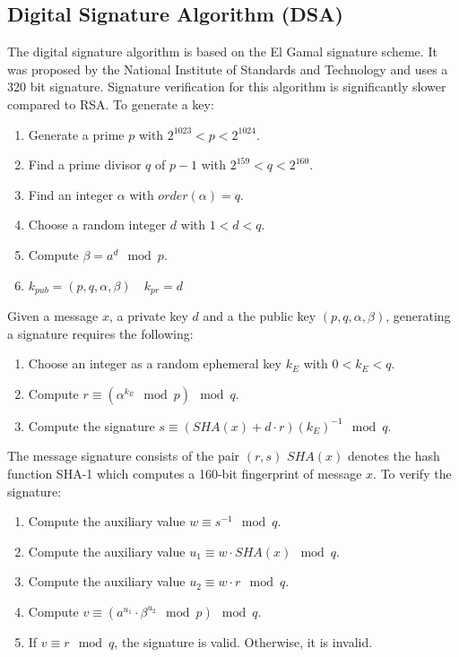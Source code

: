 \documentclass{math}
\begin{document}
\subsection*{Digital Signature Algorithm (DSA)}
The digital signature algorithm is based on the El Gamal signature scheme. It
was proposed by the National Institute of Standards and Technology and uses a
320 bit signature. Signature verification for this algorithm is significantly
slower compared to RSA. To generate a key:
\begin{enumerate}
  \item Generate a prime \( p \) with \( 2^{1023} < p < 2^{1024} \).
  \item Find a prime divisor \( q \) of \( p-1 \) with
  \( 2^{159} < q < 2^{160} \).
  \item Find an integer \( \alpha \) with \( order(\alpha) = q \).
  \item Choose a random integer \( d \) with \( 1 < d < q \).
  \item Compute \( \beta = a^d\mod p \).
  \item \( k_{pub} = (p,q,\alpha,\beta) \quad k_{pr} = d \)
\end{enumerate}
Given a message \( x \), a private key \( d \) and a the public key
\( (p,q,\alpha,\beta) \), generating a signature requires the following:
\begin{enumerate}
  \item Choose an integer as a random ephemeral key \( k_E \) with
  \( 0 < k_E < q \).
  \item Compute \( r \equiv (\alpha^{k_E}\mod p)\mod q \).
  \item Compute the signature \( s \equiv (SHA(x)+d\cdot r)(k_E)^{-1}\mod q \).
\end{enumerate}
The message signature consists of the pair \( (r,s) \) \( SHA(x) \) denotes the
hash function SHA-1 which computes a 160-bit fingerprint of message \( x \). To
verify the signature:
\begin{enumerate}
  \item Compute the auxiliary value \( w \equiv s^{-1}\mod q \).
  \item Compute the auxiliary value \( u_1 \equiv w\cdot SHA(x)\mod q \).
  \item Compute the auxiliary value \( u_2 \equiv w\cdot r\mod q \).
  \item Compute \( v \equiv (a^{u_1}\cdot\beta^{u_2}\mod p)\mod q \).
  \item If \( v \equiv r\mod q \), the signature is valid. Otherwise, it is
  invalid.
\end{enumerate}
\end{document}
